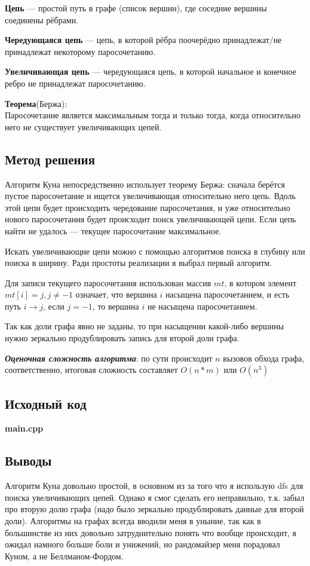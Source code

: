 \documentclass[12pt]{article}
\newcommand{\print}[1]{{\large  \bf  #1} 
{\scriptsize }}
\begin{document}
\textbf{Цепь} --- простой путь в графе (список вершин), где соседние вершины соединены рёбрами.

\textbf{Чередующаяся цепь} --- цепь, в которой рёбра поочерёдно принадлежат/не принадлежат некоторому паросочетанию.

\textbf{Увеличивающая цепь} --- чередующаяся цепь, в которой начальное и конечное ребро не принадлежат паросочетанию.

\textbf{Теорема}(Бержа):\\Паросочетание является максимальным тогда и только тогда, когда относительно него не существует увеличивающих цепей.

\subsection*{Метод решения}

Алгоритм Куна непосредственно использует теорему Бержа: сначала берётся пустое паросочетание и ищется увеличивающая относительно него цепь. Вдоль этой цепи будет происходить чередование паросочетания, и уже относительно нового паросочетания будет происходит поиск увеличивающей цепи. Если цепь найти не удалось --- текущее паросочетание максимальное.

Искать увеличивающие цепи можно с помощью алгоритмов поиска в глубину или поиска в ширину. Ради простоты реализации я выбрал первый алгоритм.

Для записи текущего паросочетания использован массив $mt$, в котором элемент $mt[i] = j,j \ne -1$ означает, что вершина $i$ насыщена паросочетанием, и есть путь $i \rightarrow j$, если $j = -1$, то вершина $i$ не насыщена паросочетанием.

Так как доли графа явно не заданы, то при насыщении какой-либо вершины нужно зеркально продублировать запись для второй доли графа.

\textit{ \textbf{Оценочная сложность алгоритма}}: по сути происходит $n$ вызовов обхода графа, соответственно, итоговая сложность составляет $O(n*m)$ или $O(n^3)$  
\subsection*{Исходный код}

\print{main.cpp}


% 
\subsection*{Выводы}

Алгоритм Куна довольно простой, в основном из за того что я использую dfs для поиска увеличивающих цепей. Однако я смог сделать его неправильно, т.к. забыл про вторую долю графа (надо было зеркально продублировать данные для второй доли). Алгоритмы на графах всегда вводили меня в уныние, так как в большинстве из них довольно затруднительно понять что вообще происходит, я ожидал намного больше боли и унижений, но рандомайзер меня порадовал Куном, а не Беллманом-Фордом.
\end{document}
